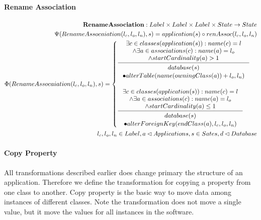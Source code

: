 \documentclass[11pt]{article}
\begin{document}
\paragraph{Rename Association}
\begin{align*}
\mathbf{RenameAssociation} : Label \times Label \times Label \times State \rightarrow State \\
\Psi(RenameAssocaiation(l_c, l_o, l_n), s) = application(s) \circ renAssoc(l_c, l_o, l_n)\\
\Phi(RenameAssocaiation(l_c, l_o, l_n), s) = \begin{cases}
	\inference{\exists c \in classes(application(s)) : name(c) = l\\ 
		\wedge \exists a \in associations(c) : name(a) = l_o 
	\\ \wedge startCardinality(a) > 1 }{\begin{gathered}
		database(s) \\ \bullet alterTable(name(owningClass(a)) + l_o, l_n)
\end{gathered}}\\ \\
  \inference{\exists c \in classes(application(s)) : name(c) = l\\ 
		\wedge \exists a \in associations(c) : name(a) = l_o 
	\\ \wedge startCardinality(a) \leq 1 }{\begin{gathered}
database(s) \\ \bullet alterForeignKey(endClass(a) ,l_c, l_o, l_n)
\end{gathered}}
 \end{cases} \\
	l_c, l_o, l_n \in Label, a \lhd Applications, s \in Sates, d \lhd Database
\end{align*}


\paragraph{Copy Property}
All transformations described earlier does change primary the structure of an application. Therefore we define  the transformation for copying a property from one class to another. Copy property is the basic way to move data among instances of different classes. Note the transformation does not move a single value, but it move the values for all instances in the software.
\end{document}
